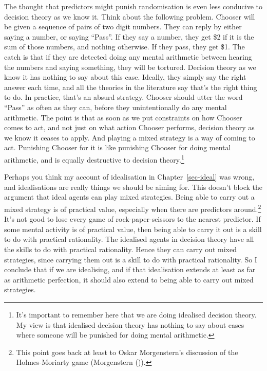 \documentclass[
  12pt,
  letterpaper,
  DIV=11,
  numbers=noendperiod]{scrreprt}
\begin{document}
The thought that predictors might punish randomisation is even less
conducive to decision theory as we know it. Think about the following
problem. Chooser will be given a sequence of pairs of two digit numbers.
They can reply by either saying a number, or saying ``Pass''. If they
say a number, they get \$2 if it is the sum of those numbers, and
nothing otherwise. If they pass, they get \$1. The catch is that if they
are detected doing any mental arithmetic between hearing the numbers and
saying something, they will be tortured. Decision theory as we know it
has nothing to say about this case. Ideally, they simply say the right
answer each time, and all the theories in the literature say that's the
right thing to do. In practice, that's an absurd strategy. Chooser
should utter the word ``Pass'' as often as they can, before they
unintentionally do any mental arithmetic. The point is that as soon as
we put constraints on how Chooser comes to act, and not just on what
action Chooser performs, decision theory as we know it ceases to apply.
And playing a mixed strategy is a way of coming to act. Punishing
Chooser for it is like punishing Chooser for doing mental arithmetic,
and is equally destructive to decision theory.\footnote{It's important
  to remember here that we are doing idealised decision theory. My view
  is that idealised decision theory has nothing to say about cases where
  someone will be punished for doing mental arithmetic.}

Perhaps you think my account of idealisation in Chapter~\ref{sec-ideal}
was wrong, and idealisations are really things we should be aiming for.
This doesn't block the argument that ideal agents can play mixed
strategies. Being able to carry out a mixed strategy is of practical
value, especially when there are predictors around.\footnote{This point
  goes back at least to Oskar Morgenstern's discussion of the
  Holmes-Moriarty game (Morgenstern
  ()).} It's not good to
lose every game of rock-paper-scissors to the nearest predictor. If some
mental activity is of practical value, then being able to carry it out
is a skill to do with practical rationality. The idealised agents in
decision theory have all the skills to do with practical rationality.
Hence they can carry out mixed strategies, since carrying them out is a
skill to do with practical rationality. So I conclude that if we are
idealising, and if that idealisation extends at least as far as
arithmetic perfection, it should also extend to being able to carry out
mixed strategies.
\end{document}
